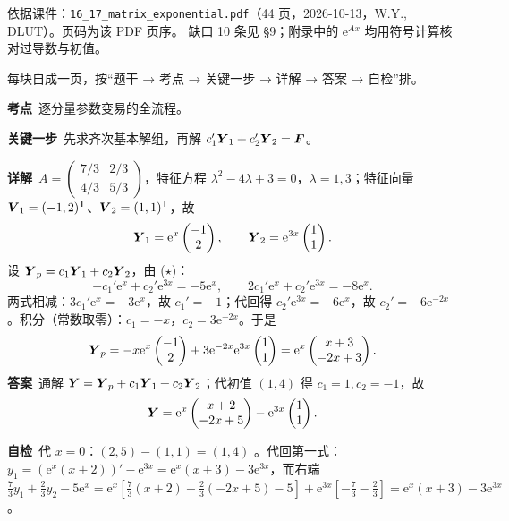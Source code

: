 \documentclass[11pt]{ctexart}
\renewcommand{\qbreak}{\needspace{0.26\textheight}}
\newcommand{\mat}[1]{\begin{pmatrix}#1\end{pmatrix}}
\begin{document}
\flowerrule

{\small\color{inkgray}
依据课件：\texttt{16\_17\_matrix\_exponential.pdf}（44 页，2026-10-13，W.Y., DLUT）。页码为该 PDF 页序。
缺口 10 条见 §9；附录中的 $\mathrm{e}^{Ax}$ 均用符号计算核对过导数与初值。}

每块自成一页，按“题干 → 考点 → 关键一步 → 详解 → 答案 → 自检”排。

\qbreak
{}
\label{c4:app:ex1}
\qbreak
{}
\par\textbf{考点}\ 逐分量参数变易的全流程。
\par\textbf{关键一步}\ 先求齐次基本解组，再解 $c_1'\boldsymbol{Y}_1+c_2'\boldsymbol{Y}_2=\boldsymbol{F}$。
\par\textbf{详解}\ $A=\mat{7/3&2/3\\4/3&5/3}$，特征方程 $\lambda^2-4\lambda+3=0$，$\lambda=1,3$；特征向量 $\boldsymbol{V}_1=(-1,2)^{\mathsf T}$、$\boldsymbol{V}_2=(1,1)^{\mathsf T}$，故
\[
\vect{Y}_1=\mathrm{e}^{x}\mat{-1\\2},\qquad \vect{Y}_2=\mathrm{e}^{3x}\mat{1\\1}.
\]
设 $\boldsymbol{Y}_p=c_1\boldsymbol{Y}_1+c_2\boldsymbol{Y}_2$，由 ($\star$)：
\[
-c_1'\mathrm{e}^x+c_2'\mathrm{e}^{3x}=-5\mathrm{e}^x,\qquad
2c_1'\mathrm{e}^x+c_2'\mathrm{e}^{3x}=-8\mathrm{e}^x .
\]
两式相减：$3c_1'\mathrm{e}^x=-3\mathrm{e}^x$，故 $c_1'=-1$；代回得 $c_2'\mathrm{e}^{3x}=-6\mathrm{e}^x$，故 $c_2'=-6\mathrm{e}^{-2x}$。积分（常数取零）：$c_1=-x$，$c_2=3\mathrm{e}^{-2x}$。于是
\[
\vect{Y}_p=-x\mathrm{e}^x\mat{-1\\2}+3\mathrm{e}^{-2x}\mathrm{e}^{3x}\mat{1\\1}=\mathrm{e}^x\mat{x+3\\-2x+3}.
\]
\textbf{答案}\ 通解 $\boldsymbol{Y}=\boldsymbol{Y}_p+c_1\boldsymbol{Y}_1+c_2\boldsymbol{Y}_2$；代初值 $(1,4)$ 得 $c_1=1,c_2=-1$，故
\[
\vect{Y}=\mathrm{e}^x\mat{x+2\\-2x+5}-\mathrm{e}^{3x}\mat{1\\1}.
\]
\par\textbf{自检}\ 代 $x=0$：$(2,5)-(1,1)=(1,4)$ 。代回第一式：$y_1=(\mathrm{e}^x(x+2))'-\mathrm{e}^{3x}=\mathrm{e}^x(x+3)-3\mathrm{e}^{3x}$，而右端 $\tfrac73y_1+\tfrac23y_2-5\mathrm{e}^x=\mathrm{e}^x[\tfrac73(x+2)+\tfrac23(-2x+5)-5]+\mathrm{e}^{3x}[-\tfrac73-\tfrac23]=\mathrm{e}^x(x+3)-3\mathrm{e}^{3x}$ 。
\end{document}
